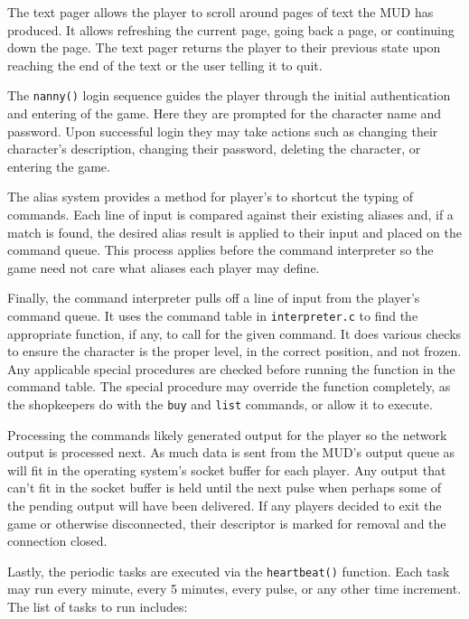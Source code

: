 \documentclass[11pt]{article}
\begin{document}
\par
The text pager allows the player to scroll around pages of text the MUD has produced.  It allows refreshing the current page, going back a page, or continuing down the page.  The text pager returns the player to their previous state upon reaching the end of the text or the user telling it to quit.
\par
The \texttt{nanny()} login sequence guides the player through the initial authentication and entering of the game.  Here they are prompted for the character name and password.  Upon successful login they may take actions such as changing their character's description, changing their password, deleting the character, or entering the game.
\par
The alias system provides a method for player's to shortcut the typing of commands.  Each line of input is compared against their existing aliases and, if a match is found, the desired alias result is applied to their input and placed on the command queue.  This process applies before the command interpreter so the game need not care what aliases each player may define.
\par
Finally, the command interpreter pulls off a line of input from the player's command queue.  It uses the command table in \texttt{interpreter.c} to find the appropriate function, if any, to call for the given command.  It does various checks to ensure the character is the proper level, in the correct
position, and not frozen.  Any applicable special procedures are checked before running the function in the command table.  The special procedure may override the function completely, as the shopkeepers do with the \texttt{buy} and \texttt{list} commands, or allow it to execute.
\par
Processing the commands likely generated output for the player so the network output is processed next.  As much data is sent from the MUD's output queue as will fit in the operating system's socket buffer for each player.  Any output that can't fit in the socket buffer is held until the next pulse when perhaps some of the pending output will have been delivered.  If any players decided to exit the game or otherwise disconnected, their descriptor is marked for removal and the connection closed.
\par
Lastly, the periodic tasks are executed via the \texttt{heartbeat()} function.  Each task may run every minute, every 5 minutes, every pulse, or any other time increment.  The list of tasks to run includes:
\end{document}
